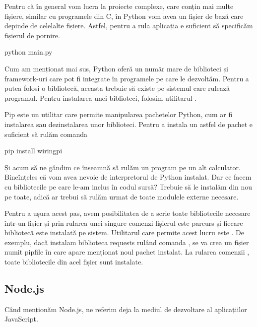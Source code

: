 Pentru că în general vom lucra la proiecte complexe, care conțin mai multe
fișiere, similar cu programele din C, în Python vom avea un fișier de bază care
depinde de celelalte fișiere. Astfel, pentru a rula aplicația e suficient să
specificăm fișierul de pornire.

\begin{screen}[caption={Exemplu rulare python}]
python main.py
\end{screen}

Cum am menționat mai sus, Python oferă un număr mare de biblioteci și
framework-uri care pot fi integrate în programele pe care le dezvoltăm. Pentru a
putea folosi o bibliotecă, aceasta trebuie să existe pe sistemul care rulează
programul. Pentru instalarea unei biblioteci, folosim utilitarul .

Pip este un utilitar care permite manipularea pachetelor Python, cum ar fi
instalarea sau dezinstalarea unor biblioteci. Pentru a instala un astfel de
pachet e suficient să rulăm comanda 

\begin{screen}[caption={Exemplu instalare de framework-uri}]
pip install wiringpi
\end{screen}

Și acum să ne gândim ce înseamnă să rulăm un program pe un alt calculator.
Bineînțeles că vom avea nevoie de interpretorul de Python instalat. Dar ce facem
cu bibliotecile pe care le-am inclus în codul sursă? Trebuie să le instalăm din
nou pe toate, adică ar trebui să rulăm  urmat de toate modulele
externe necesare.

Pentru a ușura acest pas, avem posibilitatea de a scrie toate bibliotecile
necesare într-un fișier și prin rularea unei singure comenzi fișierul este
parcurs și fiecare bibliotecă este instalată pe sistem. Utilitarul care permite
acest lucru este . De exemplu, dacă instalam biblioteca requests
rulând comanda , se va crea un fișier numit pipfile
în care apare menționat noul pachet instalat. La rularea comenzii , toate bibliotecile din acel fișier sunt instalate.

\subsection{Node.js}
\label{sec:appdev-ideinstall-js}

Când menționăm Node.js, ne referim deja la mediul de dezvoltare al aplicațiilor
JavaScript.

